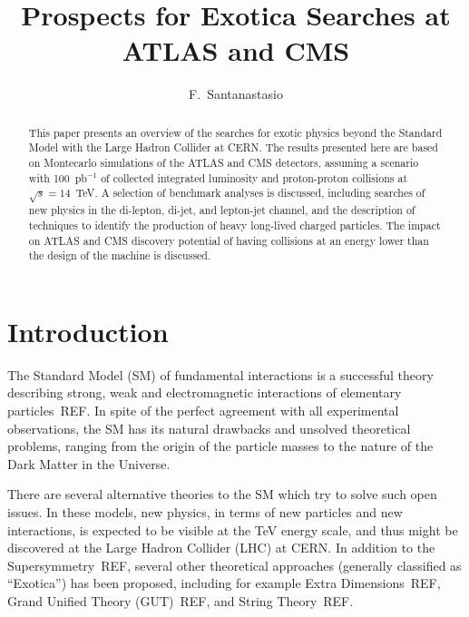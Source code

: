 \documentclass{cimento}
\title{Prospects for Exotica Searches at ATLAS and CMS}
\author{F.~Santanastasio\from{ins:UMD}\ETC
}
\begin{document}
\maketitle

\begin{abstract}
This paper presents an overview of the searches for exotic physics 
beyond the Standard Model with the Large Hadron Collider at CERN. 
The results presented here are based on Montecarlo simulations of the
ATLAS and CMS detectors, assuming a scenario with 
100~pb$^{-1}$ of collected integrated luminosity and proton-proton collisions 
at $\sqrt{s} = 14$~TeV. A selection of benchmark analyses is discussed, 
including searches of new physics in the di-lepton, di-jet, and lepton-jet channel, 
and the description of techniques to identify the production of 
heavy long-lived charged particles. 
The impact on ATLAS and CMS discovery potential 
of having collisions at an energy lower than the design of the machine 
is discussed.
\end{abstract}

\section{Introduction}
The Standard Model (SM) of fundamental interactions is a successful theory 
describing strong, weak and electromagnetic interactions of elementary 
particles~REF. 
In spite of the perfect agreement with all experimental 
observations, the SM has its natural drawbacks and unsolved theoretical 
problems, ranging from the origin of the particle masses to the nature of the 
Dark Matter in the Universe.

There are several alternative theories to the SM which try to solve such 
open issues. In these models, new physics, in terms of new particles and 
new interactions, is expected to be visible at the TeV energy scale, and 
thus might be discovered at the Large Hadron Collider (LHC) at CERN.
In addition to the Supersymmetry~REF, 
several other theoretical approaches 
(generally classified as ``Exotica'') has been proposed, 
including for example Extra Dimensions~REF, Grand Unified Theory (GUT)~REF, 
and String Theory~REF. 
\end{document}
